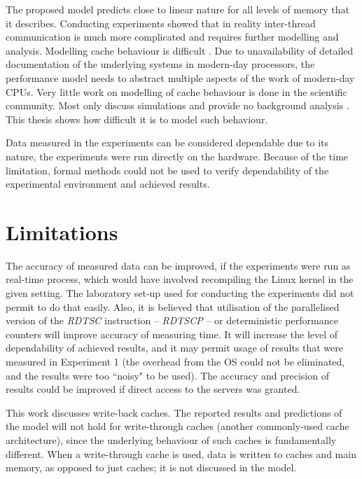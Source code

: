 The proposed model predicts close to linear nature for all levels of memory that it describes. Conducting experiments showed that in reality inter-thread communication is much more complicated and requires further modelling and analysis. Modelling cache behaviour is difficult \cite{Putigny2014}. Due to unavailability of detailed documentation of the underlying systems in modern-day processors, the performance model needs to abstract multiple aspects of the work of modern-day CPUs. Very little work on modelling of cache behaviour is done in the scientific community. Most only discuss simulations and provide no background analysis \cite{Heidelberger1990,Archibald1986,Zhao2011}. This thesis shows how difficult it is to model such behaviour.

Data measured in the experiments can be considered dependable due to its nature, the experiments were run directly on the hardware. Because of the time limitation, formal methods could not be used to verify dependability of the experimental environment and achieved results.

\section{Limitations}

The accuracy of measured data can be improved, if the experiments were run as real-time process, which would have involved recompiling the Linux kernel in the given setting. The laboratory set-up used for conducting the experiments did not permit to do that easily. Also, it is believed that utilisation of the parallelised version of the \textit{RDTSC} instruction -- \textit{RDTSCP} -- or deterministic performance counters \cite{Weaver2013} will improve accuracy of measuring time. It will increase the level of dependability of achieved results, and it may permit usage of results that were measured in Experiment 1 (the overhead from the OS could not be eliminated, and the results were too ``noisy" to be used). The accuracy and precision of results could be improved if direct access to the servers was granted.

This work discusses write-back caches. The reported results and predictions of the model will not hold for write-through caches (another commonly-used cache architecture), since the underlying behaviour of such caches is fundamentally different. When a write-through cache is used, data is written to caches and main memory, as opposed to just caches; it is not discussed in the model.

